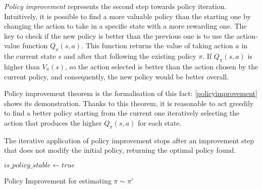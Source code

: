 \textit{Policy improvement} represents the second step towards policy iteration. Intuitively, it is possible to find a more valuable policy than the starting one by changing the action to take in a specific state with a more rewarding one.  The key to check if the new policy is better than the previous one is to use the action-value function $Q_\pi(s,a)$. This function returns the value of taking action $a$ in the current state $s$ and after that following the existing policy $\pi$. If $Q_\pi(s,a)$ is higher than $V_\pi(s)$, so the action selected is better than the action chosen by the current policy, and consequently, the new policy would be better overall.

Policy improvement theorem is the formalisation of this fact: \vref{policyimprovement} shows its demonstration. Thanks to this theorem, it is reasonable to act greedily to find a better policy starting from the current one iteratively selecting the action that produces the higher  $Q_\pi(s, a)$ for each state.


The iterative application of policy improvement stops after an improvement step that does not modify the initial policy, returning the optimal policy found.

\begin{algorithm}
	\SetAlgoLined
	\DontPrintSemicolon
	\LinesNumbered
	$is\_policy\_stable \leftarrow true$\;
	\caption{Policy Improvement for estimating $\pi \sim \pi'$}
	\label{policy_improvement}
\end{algorithm}



